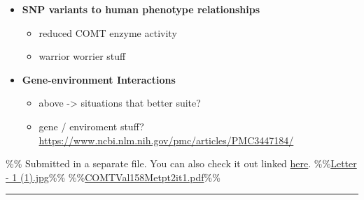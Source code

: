 \documentclass[letterpaper]{article}
\begin{document}
\begin{itemize}
\begin{itemize}
\item \textbf{SNP variants to human phenotype relationships}

\begin{itemize}
\item reduced COMT enzyme activity
\item warrior worrier stuff
\end{itemize}

\item \textbf{Gene-environment Interactions}

\begin{itemize}
\item above -> situations that better suite?
\item gene / enviroment stuff?
\url{https://www.ncbi.nlm.nih.gov/pmc/articles/PMC3447184/}
\end{itemize}
\end{itemize}
\end{itemize}

\%\% Submitted in a separate file. You can also check it out linked
\href{https://www.figma.com/file/CADCiIWAFlqyFZu0Qayj62/COMT?node-id=0\%3A1}{here}.
\%\%\href{Letter - 1 (1).jpg.org}{Letter - 1 (1).jpg}\%\%
\%\%\href{COMTVal158Metpt2it1.pdf.org}{COMTVal158Metpt2it1.pdf}\%\%

\noindent\rule{\textwidth}{0.5pt}
\end{document}
